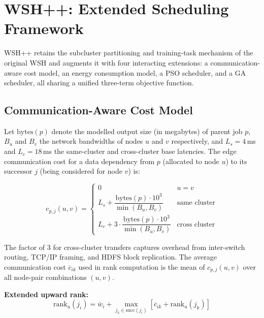 \documentclass[10pt,twocolumn]{article}
\begin{document}
\section{WSH++: Extended Scheduling Framework}
\label{sec:wshpp}

WSH++ retains the subcluster partitioning and training-task mechanism of the
original WSH and augments it with four interacting extensions: a
communication-aware cost model, an energy consumption model, a PSO scheduler, and a
GA scheduler, all sharing a unified three-term objective function.

\subsection{Communication-Aware Cost Model}

Let $\text{bytes}(p)$ denote the modelled output size (in megabytes) of parent job
$p$, $B_u$ and $B_v$ the network bandwidths of nodes $u$ and $v$ respectively, and
$L_s = 4$\,ms and $L_c = 18$\,ms the same-cluster and cross-cluster base latencies.
The edge communication cost for a data dependency from $p$ (allocated to node $u$)
to its successor $j$ (being considered for node $v$) is:

\begin{equation}
    c_{p,j}(u,v) = \begin{cases}
        0 & u = v \\[4pt]
        L_s + \dfrac{\text{bytes}(p) \cdot 10^3}{\min(B_u, B_v)} & \text{same cluster} \\[8pt]
        L_c + 3 \cdot \dfrac{\text{bytes}(p) \cdot 10^3}{\min(B_u, B_v)} & \text{cross cluster}
    \end{cases}
    \label{eq:comm_cost}
\end{equation}

The factor of 3 for cross-cluster transfers captures overhead from inter-switch
routing, TCP/IP framing, and HDFS block replication. The average communication cost
$\overline{c}_{ik}$ used in rank computation is the mean of $c_{p,j}(u,v)$ over all
node-pair combinations $(u,v)$.

\noindent\textbf{Extended upward rank:}
\begin{equation}
    \text{rank}_u(j_i) = \overline{w}_i + \max_{j_k \in \text{succ}(j_i)}
    \!\left[\overline{c}_{ik} + \text{rank}_u(j_k)\right]
    \label{eq:ext_rank}
\end{equation}
\end{document}
